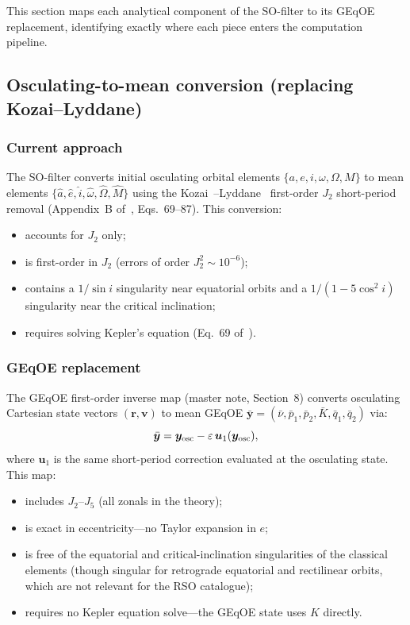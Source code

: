 \documentclass[11pt]{article}
\newcommand{\eps}{\varepsilon}
\begin{document}
This section maps each analytical component of the SO-filter to its GEqOE
replacement, identifying exactly where each piece enters the computation
pipeline.

\subsection{Osculating-to-mean conversion (replacing Kozai--Lyddane)}
\label{sec:osc2mean}

\subsubsection{Current approach}

The SO-filter converts initial osculating orbital elements
$\{a, e, i, \omega, \Omega, M\}$ to mean elements
$\{\hat a, \hat e, \hat i, \hat\omega, \hat\Omega, \hat M\}$ using the
Kozai~\cite{kozai1959}--Lyddane~\cite{lyddane1963} first-order $J_2$
short-period removal (Appendix~B of~\cite{rivero2025}, Eqs.~69--87). This
conversion:
\begin{itemize}
\item accounts for $J_2$ only;
\item is first-order in $J_2$ (errors of order $J_2^2 \sim 10^{-6}$);
\item contains a $1/\sin i$ singularity near equatorial orbits and a
$1/(1-5\cos^2 i)$ singularity near the critical inclination;
\item requires solving Kepler's equation (Eq.~69 of~\cite{rivero2025}).
\end{itemize}

\subsubsection{GEqOE replacement}

The GEqOE first-order inverse map (master note, Section~8) converts
osculating Cartesian state vectors $(\bm r, \bm v)$ to mean GEqOE
$\bar{\bm y} = (\bar\nu, \bar p_1, \bar p_2, \bar K, \bar q_1, \bar q_2)$
via:
\begin{equation}
\bar{\bm y} = \bm y_{\rm osc} - \eps\,\bm u_1(\bm y_{\rm osc}),
\label{eq:inverse_map}
\end{equation}
where $\bm u_1$ is the same short-period correction evaluated at the
osculating state. This map:
\begin{itemize}
\item includes $J_2$--$J_5$ (all zonals in the theory);
\item is exact in eccentricity---no Taylor expansion in $e$;
\item is free of the equatorial and critical-inclination singularities of the
classical elements (though singular for retrograde equatorial and rectilinear
orbits, which are not relevant for the RSO catalogue);
\item requires no Kepler equation solve---the GEqOE state uses $K$ directly.
\end{itemize}
\end{document}
